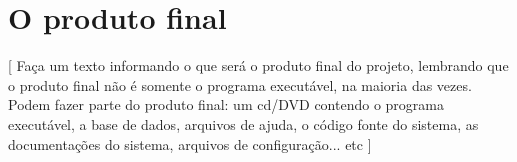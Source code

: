 \section{O produto final}

{\color{red}[
    Faça um texto informando o que será o produto final do projeto, lembrando que o produto final não é somente o programa executável, na maioria das vezes. Podem fazer parte do produto final: um cd/DVD contendo o programa executável, a base de dados, arquivos de ajuda, o código fonte do sistema, as documentações do sistema, arquivos de configuração... etc
]}
